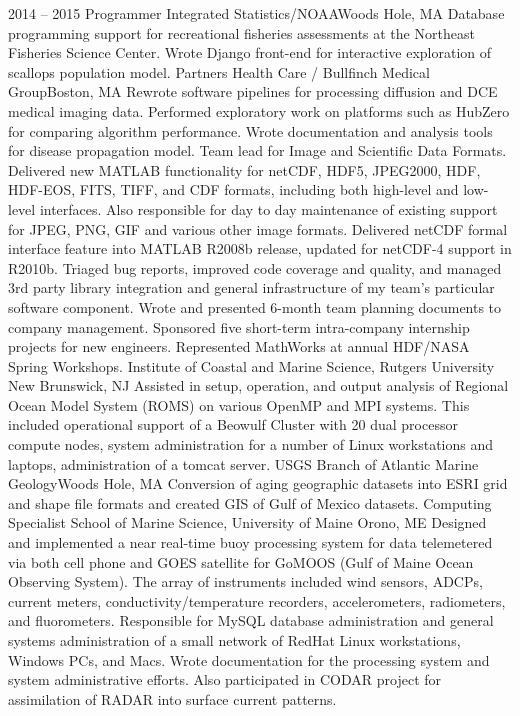 \documentclass[11pt]{moderncv}  %
\begin{document}
\cventry
{2014 -- 2015}
{Programmer}
{Integrated Statistics/NOAA}{Woods Hole, MA}{}
{
Database programming support for recreational fisheries assessments
at the Northeast Fisheries Science Center. Wrote Django front-end for
interactive exploration of scallops population model.
}
{
	Partners Health Care / Bullfinch Medical Group}{Boston, MA}{}{
    Rewrote software pipelines for processing diffusion and DCE medical
    imaging data.  Performed exploratory work on platforms such as
    HubZero  for comparing algorithm performance. Wrote documentation
    and analysis tools for disease propagation model.
}
{   
Team lead for Image and Scientific Data Formats.  Delivered new MATLAB functionality for netCDF, HDF5, JPEG2000, HDF, HDF-EOS, FITS, TIFF, and CDF formats, including both high-level and low-level interfaces.  Also responsible for day to day maintenance of existing support for JPEG, PNG, GIF and various other image formats.  Delivered netCDF formal interface feature into MATLAB R2008b release, updated for netCDF-4 support in R2010b. Triaged bug reports, improved code coverage and quality, and managed 3rd party library integration and general infrastructure of my team's particular software component.  Wrote and presented 6-month team planning documents to company management.  Sponsored five short-term intra-company internship projects for new engineers.  Represented MathWorks at annual HDF/NASA Spring Workshops.
}
{
	Institute of Coastal and Marine Science, Rutgers University}
    {New Brunswick, NJ}{} {
Assisted in setup,  operation, and output analysis  of Regional Ocean Model System (ROMS) on various OpenMP and MPI systems.  This included operational support of a Beowulf Cluster with 20 dual processor compute nodes, system administration for a number of Linux workstations and laptops, administration of a tomcat server.
}
{
	USGS Branch of Atlantic Marine Geology}{Woods Hole, MA}{}{
    Conversion of aging geographic datasets into ESRI grid and shape
    file formats and created GIS of Gulf of Mexico datasets.
}
{Computing Specialist}
{School of Marine Science, University of Maine}
{Orono, ME}{}
{
    Designed and implemented a near real-time buoy processing system
    for data telemetered via both cell phone and GOES satellite for
    GoMOOS (Gulf of Maine Ocean Observing System).   The array of
    instruments included wind sensors, ADCPs, current meters,
    conductivity/temperature recorders, accelerometers, radiometers,
    and fluorometers.   Responsible for MySQL database administration
    and general systems administration of a small network of RedHat
    Linux workstations, Windows PCs, and Macs.   Wrote documentation
    for the processing system and system administrative efforts.
    Also participated in CODAR project for assimilation of RADAR
    into surface current patterns.
}
\end{document}
